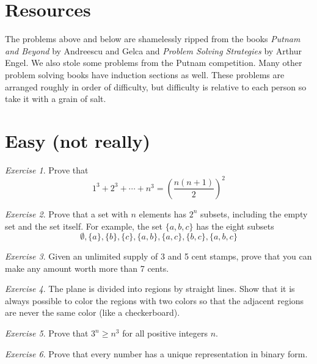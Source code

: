 \documentclass{article}
\theoremstyle{definition}
\theoremstyle{remark}
\newtheorem{exercise}{Exercise}
\begin{document}
\section{Resources}

The problems above and below are shamelessly ripped from the books \textit{Putnam and Beyond} by Andreescu and Gelca and \textit{Problem Solving Strategies} by Arthur Engel. We also stole some problems from the Putnam competition. Many other problem solving books have induction sections as well. These problems are arranged roughly in order of difficulty, but difficulty is relative to each person so take it with a grain of salt.

\section{Easy (not really)}

\begin{exercise}
    Prove that
    \[1^3 + 2^3 +\cdots+n^3 = \left(\frac{n(n+1)}{2}\right)^2\]
\end{exercise}

\begin{exercise}
    Prove that a set with $n$ elements has $2^n$ subsets, including the empty set and the set itself. For example, the set $\{a,b,c\}$ has the eight subsets
    \[\emptyset,\{a\},\{b\},\{c\},\{a,b\},\{a,c\},\{b,c\},\{a,b,c\}\]
\end{exercise}

\begin{exercise}
    Given an unlimited supply of 3 and 5 cent stamps, prove that you can make any amount worth more than 7 cents.
\end{exercise}

\begin{exercise}
    The plane is divided into regions by straight lines. Show that it is always possible to color the regions with two colors so that the adjacent regions are never the same color (like a checkerboard).
\end{exercise}

\begin{exercise}
    Prove that \(3^n\geq n^3\) for all positive integers \(n\).
\end{exercise}

\begin{exercise}
    Prove that every number has a unique representation in binary form.
\end{exercise}
\end{document}
